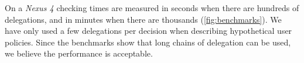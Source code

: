 \documentclass[]{llncs}
\begin{document}
On a \emph{Nexus 4} checking times are measured in seconds when there are hundreds of delegations, and in minutes when there are thousands (\autoref{fig:benchmarks}).
We have only used a few delegations per decision when describing hypothetical user policies.
Since the benchmarks show that long chains of delegation can be used, we believe the performance is acceptable.

\end{document}
